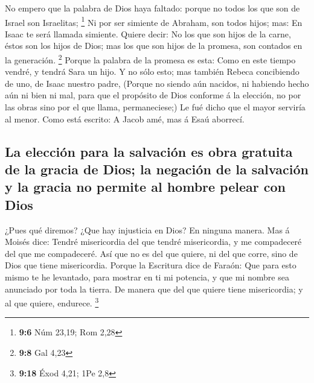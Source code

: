  No empero que la palabra de Dios haya faltado: porque no
todos los que son de Israel son Israelitas; \footnote{\textbf{9:6} Núm
  23,19; Rom 2,28}  Ni por ser simiente de Abraham, son
todos hijos; mas: En Isaac te será llamada simiente. 
Quiere decir: No los que son hijos de la carne, éstos son los hijos de
Dios; mas los que son hijos de la promesa, son contados en la
generación. \footnote{\textbf{9:8} Gal 4,23}  Porque la
palabra de la promesa es esta: Como en este tiempo vendré, y tendrá Sara
un hijo.  Y no sólo esto; mas también Rebeca concibiendo
de uno, de Isaac nuestro padre,  (Porque no siendo aún
nacidos, ni habiendo hecho aún ni bien ni mal, para que el propósito de
Dios conforme á la elección, no por las obras sino por el que llama,
permaneciese;)  Le fué dicho que el mayor serviría al
menor.  Como está escrito: A Jacob amé, mas á Esaú
aborrecí.

\hypertarget{la-elecciuxf3n-para-la-salvaciuxf3n-es-obra-gratuita-de-la-gracia-de-dios-la-negaciuxf3n-de-la-salvaciuxf3n-y-la-gracia-no-permite-al-hombre-pelear-con-dios}{%
\subsection{La elección para la salvación es obra gratuita de la gracia
de Dios; la negación de la salvación y la gracia no permite al hombre
pelear con
Dios}\label{la-elecciuxf3n-para-la-salvaciuxf3n-es-obra-gratuita-de-la-gracia-de-dios-la-negaciuxf3n-de-la-salvaciuxf3n-y-la-gracia-no-permite-al-hombre-pelear-con-dios}}

 ¿Pues qué diremos? ¿Que hay injusticia en Dios? En
ninguna manera.  Mas á Moisés dice: Tendré misericordia
del que tendré misericordia, y me compadeceré del que me compadeceré.
 Así que no es del que quiere, ni del que corre, sino de
Dios que tiene misericordia.  Porque la Escritura dice de
Faraón: Que para esto mismo te he levantado, para mostrar en ti mi
potencia, y que mi nombre sea anunciado por toda la tierra.
 De manera que del que quiere tiene misericordia; y al
que quiere, endurece. \footnote{\textbf{9:18} Éxod 4,21; 1Pe 2,8}

